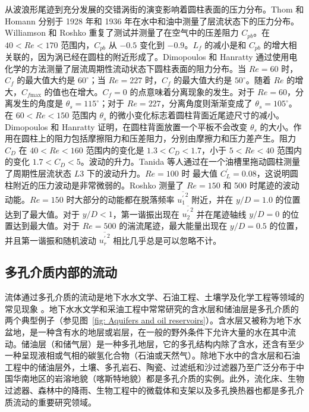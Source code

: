 从波浪形尾迹到充分发展的交错涡街的演变影响着圆柱表面的压力分布。Thom 和 Homann 分别于 1928 年和 1936 年在水中和油中测量了层流状态下的压力分布。Williamson 和 Roshko 重复了测试并测量了在空气中的压差阻力 $C_{pb}$。在 $40<Re<170$ 范围内，$C_{pb}$ 从 $-0.5$ 变化到 $-0.9$。$L_f$ 的减小是和 $C_{pb}$ 的增大相关联的，因为涡已经在圆柱的附近形成了。Dimopoulos 和 Hanratty 通过使用电化学的方法测量了层流周期性流动状态下圆柱表面的阻力分布。当 $Re=60$ 时，$C_f$ 的最大值大约是 $60^\circ$；当 $Re=227$ 时，$C_f$ 的最大值大约是 $50^\circ$。随着 $Re$ 的增大，$C_{f\text{max}}$ 的值也在增大。$C_f=0$ 的点意味着分离现象的发生。对于 $Re=60$，分离发生的角度是 $\theta_s=115^\circ$；对于 $Re=227$，分离角度则渐渐变成了 $\theta_s=105^\circ$。在 $60<Re<150$ 范围内 $\theta_s$ 的微小变化标志着圆柱背面近尾迹尺寸的减小。Dimopoulos 和 Hanratty 证明，在圆柱背面放置一个平板不会改变 $\theta_s$ 的大小。作用在圆柱上的阻力包括摩擦阻力和压差阻力，分别由摩擦力和压力差产生。阻力 $C_D$ 在 $40<Re<160$ 范围内的变化是 $1.3<C_D<1.7$，小于 $5<Re<40$ 范围内的变化 $1.7<C_D<5$。波动的升力。Tanida 等人通过在一个油槽里拖动圆柱测量了周期性层流状态 $L3$ 下的波动升力。$Re=100$ 时 最大值 $C_L^\prime=0.08$，这说明圆柱附近的压力波动是非常微弱的。Roshko 测量了 $Re=150$ 和 500 时尾迹的波动动能。$Re=150$ 时大部分的动能都在脱落频率 $\overline{{u_1^\prime}^2}$ 附近，并在 $y/D=1.0$ 的位置达到了最大值。对于 $y/D < 1$，第一谐振出现在 $\overline{{u_2^\prime}^2}$ 并在尾迹轴线 $y/D=0$ 的位置达到最大值。对于 $Re=500$ 的湍流尾迹，最大能量出现在 $y/D=0.5$ 的位置，并且第一谐振和随机波动 $\overline{{u_r^\prime}^2}$ 相比几乎总是可以忽略不计。

\subsection{多孔介质内部的流动}

流体通过多孔介质的流动是地下水水文学、石油工程、土壤学及化学工程等领域的常见现象 \cite{Bear2013}。地下水水文学和采油工程中常常研究的含水层和储油层是多孔介质的两个典型例子（参见图~\ref{fig: Aquifers and oil reservoirs}）。含水层又被称为地下水盆地，是一种含有水的地层或岩层，在一般的野外条件下允许大量的水在其中流动。储油层（和储气层）是一种多孔地层，它的多孔结构内除了含水，还含有至少一种呈现液相或气相的碳氢化合物（石油或天然气）。除地下水中的含水层和石油工程中的储油层外，土壤、多孔岩石、陶瓷、过滤纸和沙过滤器乃至广泛分布于中国华南地区的岩溶地貌（喀斯特地貌）都是多孔介质的实例。此外，流化床、生物过滤器、森林中的降雨、生物工程中的微载体和支架以及多孔换热器也都是多孔介质流动的重要研究领域。

